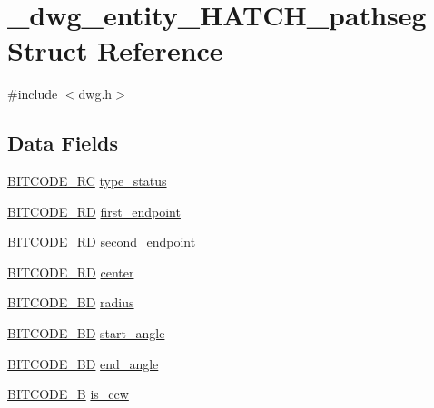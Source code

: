 \hypertarget{struct__dwg__entity__HATCH__pathseg}{\section{\-\_\-dwg\-\_\-entity\-\_\-\-H\-A\-T\-C\-H\-\_\-pathseg \-Struct \-Reference}
\label{struct__dwg__entity__HATCH__pathseg}
}


{\ttfamily \#include $<$dwg.\-h$>$}

\subsection*{\-Data \-Fields}
\begin{DoxyCompactItemize}
\item 
\hyperlink{dwg_8h_a7fd199a8f9c9cc52bdab220f65a2a619}{\-B\-I\-T\-C\-O\-D\-E\-\_\-\-R\-C} \hyperlink{struct__dwg__entity__HATCH__pathseg_a3414788035e6168de4feac0cba4af4d4}{type\-\_\-status}
\item 
\hyperlink{dwg_8h_a1d23a9bc9a02453876b244dc6706f6a6}{\-B\-I\-T\-C\-O\-D\-E\-\_\-R\-D} \hyperlink{struct__dwg__entity__HATCH__pathseg_a74ce04a72ea76fc2b97fa0ba7e768a5e}{first\-\_\-endpoint}
\item 
\hyperlink{dwg_8h_a1d23a9bc9a02453876b244dc6706f6a6}{\-B\-I\-T\-C\-O\-D\-E\-\_\-R\-D} \hyperlink{struct__dwg__entity__HATCH__pathseg_a231d2b61a0f498eaa4d281f140b8754d}{second\-\_\-endpoint}
\item 
\hyperlink{dwg_8h_a1d23a9bc9a02453876b244dc6706f6a6}{\-B\-I\-T\-C\-O\-D\-E\-\_\-R\-D} \hyperlink{struct__dwg__entity__HATCH__pathseg_a2251f987d7a30193e845c1215f72d003}{center}
\item 
\hyperlink{dwg_8h_a3c1e6781466b74ba07785d57da70ed97}{\-B\-I\-T\-C\-O\-D\-E\-\_\-\-B\-D} \hyperlink{struct__dwg__entity__HATCH__pathseg_a1b438c0f9bb1009f695d27ac16850ace}{radius}
\item 
\hyperlink{dwg_8h_a3c1e6781466b74ba07785d57da70ed97}{\-B\-I\-T\-C\-O\-D\-E\-\_\-\-B\-D} \hyperlink{struct__dwg__entity__HATCH__pathseg_ac2655e224bbdd39425ee9c5003f2c430}{start\-\_\-angle}
\item 
\hyperlink{dwg_8h_a3c1e6781466b74ba07785d57da70ed97}{\-B\-I\-T\-C\-O\-D\-E\-\_\-\-B\-D} \hyperlink{struct__dwg__entity__HATCH__pathseg_aaab6c1def4392109ba055fdcdbc00a09}{end\-\_\-angle}
\item 
\hyperlink{dwg_8h_ab533b1f62d9086749e3bb5b67e9f224e}{\-B\-I\-T\-C\-O\-D\-E\-\_\-\-B} \hyperlink{struct__dwg__entity__HATCH__pathseg_a25b86f9d0df6bc0ad3b733686050c8cf}{is\-\_\-ccw}

\end{DoxyCompactItemize}
